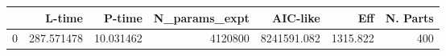 \begin{tabular}{lrrrrrr}
\toprule
{} &      L-time &     P-time &  N\_params\_expt &     AIC-like &       Eff &  N. Parts \\
\midrule
0 &  287.571478 &  10.031462 &        4120800 &  8241591.082 &  1315.822 &       400 \\
\bottomrule
\end{tabular}
